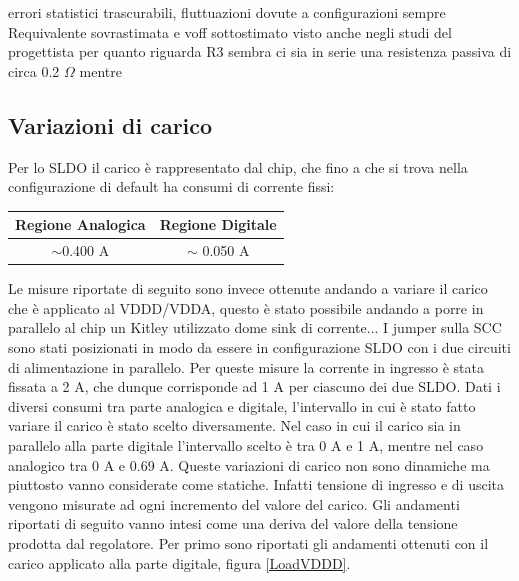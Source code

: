 errori statistici trascurabili, fluttuazioni dovute a configurazioni 
sempre Requivalente sovrastimata e voff sottostimato
visto anche negli studi del progettista 
per quanto riguarda R3 sembra ci sia in serie una resistenza passiva di circa 0.2 $\Omega$
mentre

\subsection{Variazioni di carico}
Per lo SLDO il carico è rappresentato dal chip, che fino a che si trova nella configurazione di default ha consumi di corrente fissi:
\begin{center}
\begin{tabular}{cc }
\hline
Regione Analogica & Regione Digitale \\ \hline
$\sim$0.400 A & $\sim$ 0.050 A\\ \hline     
\end{tabular}
\end{center}
Le misure riportate di seguito sono invece ottenute andando a variare il carico che è applicato al VDDD/VDDA, questo è stato possibile andando a porre in parallelo al chip un Kitley utilizzato dome sink di corrente... I jumper sulla SCC sono stati posizionati in modo da essere in configurazione SLDO con i due circuiti di alimentazione in parallelo. 
Per queste misure la corrente in ingresso è stata fissata a 2 A, che dunque corrisponde ad 1 A per ciascuno dei due SLDO. 
Dati i diversi consumi tra parte analogica e digitale, l'intervallo in cui è stato fatto variare il carico è stato scelto diversamente. Nel caso in cui il carico sia in parallelo alla parte digitale l'intervallo scelto è tra 0 A e 1 A, mentre nel caso analogico tra 0 A e 0.69 A. 
Queste variazioni di carico non sono dinamiche ma piuttosto vanno considerate come statiche. Infatti tensione di ingresso e di uscita vengono misurate ad ogni incremento del valore del carico. 
Gli andamenti riportati di seguito vanno intesi come una deriva del valore della tensione prodotta dal regolatore. 
Per primo sono riportati gli andamenti ottenuti con il carico applicato alla parte digitale, figura \ref{LoadVDDD}. 
